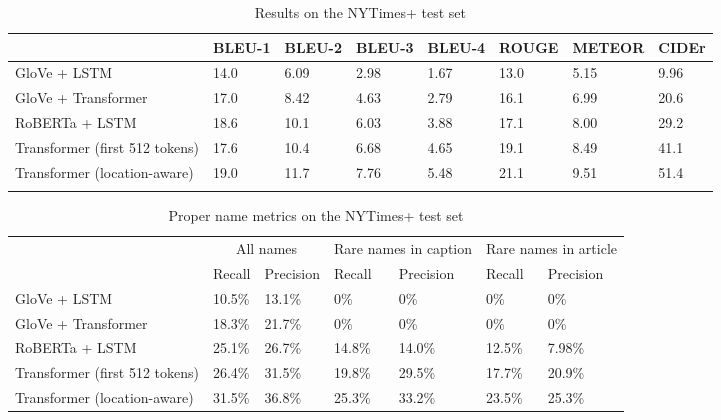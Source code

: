 \documentclass[10pt,twocolumn,letterpaper]{article}
\begin{document}
\begin{table}[t]
	\caption {Results on the NYTimes+ test set}
	\label{tab:results-nytimes}
	\centering
	\begin{tabular}{llllllll}
		\toprule
		  & BLEU-1  & BLEU-2 & BLEU-3 & BLEU-4 & ROUGE & METEOR & CIDEr \\
      \midrule
      GloVe + LSTM & 14.0 & 6.09 & 2.98 & 1.67 & 13.0 & 5.15 & 9.96 \\
      GloVe + Transformer & 17.0 & 8.42 & 4.63 & 2.79 & 16.1 & 6.99 & 20.6 \\
      RoBERTa + LSTM & 18.6 & 10.1 & 6.03 & 3.88 & 17.1 & 8.00 & 29.2 \\
      Transformer (first 512 tokens) & 17.6 & 10.4 & 6.68 & 4.65 & 19.1 & 8.49 & 41.1 \\
      Transformer (location-aware) & 19.0 & 11.7 & 7.76 & 5.48 & 21.1 & 9.51 & 51.4 \\
      \\
		\bottomrule
	\end{tabular}
\end{table}

\begin{table}[t]
	\caption {Proper name metrics on the NYTimes+ test set}
	\label{tab:results-names}
	\centering
	\begin{tabular}{lllllll}
		\toprule
        & \multicolumn{2}{c}{All names} & \multicolumn{2}{c}{Rare names in caption } & \multicolumn{2}{c}{Rare names in article } \\
        & Recall  & Precision & Recall  & Precision & Recall  & Precision \\
      \midrule
      GloVe + LSTM & 10.5\% & 13.1\% & 0\% & 0\% & 0\% & 0\%  \\
      GloVe + Transformer & 18.3\% & 21.7\% & 0\% & 0\% & 0\% & 0\%  \\
      RoBERTa + LSTM & 25.1\% & 26.7\% & 14.8\% & 14.0\% & 12.5\% & 7.98\%  \\
      Transformer (first 512 tokens) & 26.4\% & 31.5\% & 19.8\% & 29.5\% & 17.7\% & 20.9\%  \\
      Transformer (location-aware) & 31.5\% & 36.8\% & 25.3\% & 33.2\% & 23.5\% & 25.3\%   \\
		\bottomrule
	\end{tabular}
\end{table}
\end{document}
